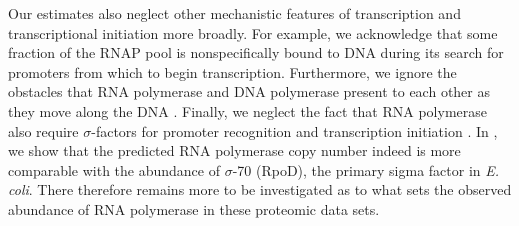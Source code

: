 Our estimates also neglect other mechanistic features of transcription and
transcriptional initiation more broadly. For example, we acknowledge that some
fraction of the RNAP pool is nonspecifically bound to DNA during its search for
promoters from which to begin transcription. Furthermore, we ignore the
obstacles that RNA polymerase and DNA polymerase present to each other as they
move along the DNA \citep{finkelstein2013}. Finally, we neglect the fact that
RNA polymerase also require $\sigma$-factors for promoter recognition and
transcription initiation \citep{browning2016}.
In , we show that the predicted RNA polymerase
copy number indeed is more comparable with the abundance of $\sigma$-70 (RpoD), the
primary sigma factor in \textit{E. coli}. There therefore remains more to be investigated
as to what sets the observed abundance of RNA polymerase in these proteomic
data sets.



